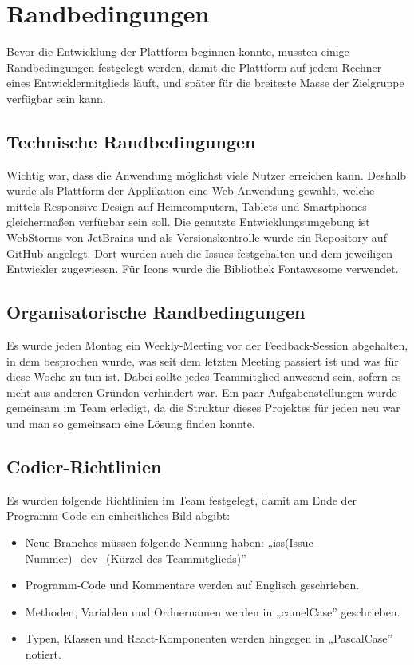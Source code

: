 \documentclass[conference,a4paper,flushend]{cs-techrep}
\begin{document}
\section{Randbedingungen}
Bevor die Entwicklung der Plattform beginnen konnte, mussten einige Randbedingungen festgelegt werden, damit die Plattform auf jedem Rechner eines Entwicklermitglieds läuft, und später für die breiteste Masse der Zielgruppe verfügbar sein kann.

\subsection{Technische Randbedingungen}
Wichtig war, dass die Anwendung möglichst viele Nutzer erreichen kann. Deshalb wurde als Plattform der Applikation eine Web-Anwendung gewählt, welche mittels Responsive Design auf Heimcomputern, Tablets und Smartphones gleichermaßen verfügbar sein soll.
Die genutzte Entwicklungsumgebung ist WebStorms von JetBrains und als Versionskontrolle wurde ein Repository auf GitHub angelegt. Dort wurden auch die Issues festgehalten und dem jeweiligen Entwickler zugewiesen. Für Icons wurde die Bibliothek Fontawesome verwendet.

\subsection{Organisatorische Randbedingungen}
Es wurde jeden Montag ein Weekly-Meeting vor der Feedback-Session abgehalten, in dem besprochen wurde, was seit dem letzten Meeting passiert ist und was für diese Woche zu tun ist. Dabei sollte jedes Teammitglied anwesend sein, sofern es nicht aus anderen Gründen verhindert war. Ein paar Aufgabenstellungen wurde gemeinsam im Team erledigt, da die Struktur dieses Projektes für jeden neu war und man so gemeinsam eine Lösung finden konnte.

\subsection{Codier-Richtlinien}
Es wurden folgende Richtlinien im Team festgelegt, damit am Ende der Programm-Code ein einheitliches Bild abgibt:

\begin{itemize}
    \item Neue Branches müssen folgende Nennung haben: „iss(Issue-Nummer)\_dev\_(Kürzel des Teammitglieds)”
    \item Programm-Code und Kommentare werden auf Englisch geschrieben.
    \item Methoden, Variablen und Ordnernamen werden in „camelCase” geschrieben.
    \item Typen, Klassen und React-Komponenten werden hingegen in „PascalCase” notiert.
\end{itemize}
\end{document}
